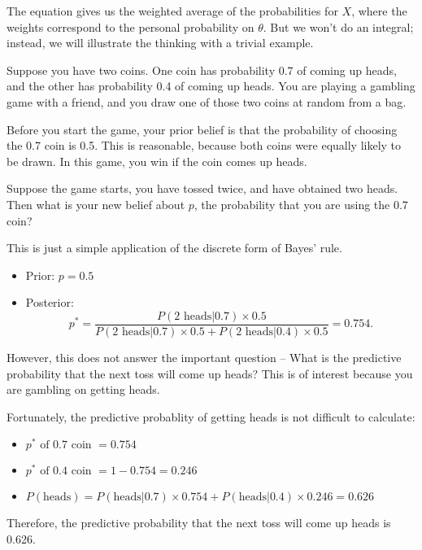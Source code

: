\documentclass[]{book}
\providecommand{\tightlist}{%
  \setlength{\itemsep}{0pt}\setlength{\parskip}{0pt}}
\theoremstyle{definition}
\theoremstyle{definition}
\theoremstyle{remark}
\let\BeginKnitrBlock\begin \let\EndKnitrBlock\end
\begin{document}
The equation gives us the weighted average of the probabilities for
\(X\), where the weights correspond to the personal probability on
\(\theta\). But we won't do an integral; instead, we will illustrate the
thinking with a trivial example.

\BeginKnitrBlock{example}
\protect\hypertarget{ex:unnamed-chunk-1}{}{\label{ex:unnamed-chunk-1}}Suppose
you have two coins. One coin has probability 0.7 of coming up heads, and
the other has probability 0.4 of coming up heads. You are playing a
gambling game with a friend, and you draw one of those two coins at
random from a bag.

Before you start the game, your prior belief is that the probability of
choosing the 0.7 coin is 0.5. This is reasonable, because both coins
were equally likely to be drawn. In this game, you win if the coin comes
up heads.

Suppose the game starts, you have tossed twice, and have obtained two
heads. Then what is your new belief about \(p\), the probability that
you are using the 0.7 coin?
\EndKnitrBlock{example}

This is just a simple application of the discrete form of Bayes' rule.

\begin{itemize}
\tightlist
\item
  Prior: \(p=0.5\)
\item
  Posterior:
  \[p^* = \frac{P(\text{2 heads}|0.7) \times 0.5}{P(\text{2 heads}|0.7) \times 0.5 + P(\text{2 heads}|0.4) \times 0.5} = 0.754.\]
\end{itemize}

However, this does not answer the important question -- What is the
predictive probability that the next toss will come up heads? This is of
interest because you are gambling on getting heads.

Fortunately, the predictive probablity of getting heads is not difficult
to calculate:

\begin{itemize}
\tightlist
\item
  \(p^* \text{ of 0.7 coin } = 0.754\)
\item
  \(p^* \text{ of 0.4 coin } = 1 − 0.754 = 0.246\)
\item
  \(P(\text{heads}) = P(\text{heads} | 0.7) \times 0.754 + P(\text{heads} | 0.4) \times 0.246 = 0.626\)
\end{itemize}

Therefore, the predictive probability that the next toss will come up
heads is 0.626.
\end{document}
